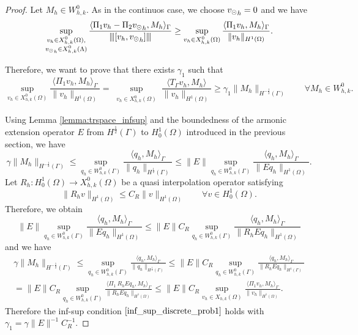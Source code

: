 \begin{proof}
Let $M_h \in W^0_{h,k}$. As in the continuos case, we choose ${v_{\odot}}_h =0$ and we have
\begin{equation*}
\sup_{\substack{v_h \in X^0_{h,k}(\Omega),\\ {v_{\odot}}_h \in X^0_{h,k}(\Lambda)}} \frac{ \langle \Pi_1 v_h - \Pi_2 {v_{\odot}}_h, M_h \rangle _{\Gamma}} {{\left\vert\kern-0.25ex\left\vert\kern-0.25ex\left\vert [v_h,  {v_{\odot}}_h] \right\vert\kern-0.25ex\right\vert\kern-0.25ex\right\vert}}
\geq \sup_{v_h \in X^0_{h,k}(\Omega)} \frac{ \langle \Pi_1 v_h, M_h \rangle _{\Gamma} } {\|v_h\|_{H^1(\Omega)}}.
\end{equation*}

Therefore, we want to prove that there exists $\gamma _1$ such that
\begin{equation*}
\sup_{v_h \in X^0_{h,k}(\Omega)} \frac{ \langle \Pi_1 v_h, M_h \rangle _{\Gamma} } {\|v_h\|_{H^1(\Omega)}}=\sup_{\substack{v_h \in X^0_{h,k}(\Omega)}} \frac{\langle T_{\Gamma} v_h , M_h \rangle}{\|v_h\|_{H^1(\Omega)}} \geq \gamma_1 \|M_h\|_{H^{-\frac 12}(\Gamma)} \qquad \forall M_h \in W_{h,k}^0.
\end{equation*}

Using Lemma \ref{lemma:trspace_infsup} and the boundedness of the armonic extension operator $E$ from $H^{\frac 12}(\Gamma)$ to $H^1_0(\Omega)$ introduced in the previous section, we have
\begin{equation*}
\gamma \|M_h\|_{H^{-\frac 12}(\Gamma)} \leq  \sup_{q_h \in W_{h,k}^0(\Gamma)} \frac{ \langle q_h, M_h \rangle _{\Gamma} } {\|q_h\|_{H^{\frac 12}(\Gamma)}} 
\leq 
\|E\| \sup_{q_h \in W_{h,k}^0(\Gamma)} \frac{ \langle q_h, M_h \rangle _{\Gamma} } {\|Eq_h\|_{H^1(\Omega)}} .
\end{equation*}
Let $R_h: H^1_0(\Omega) \rightarrow X_{h,k}^0(\Omega)$ be a quasi interpolation operator satisfying 
\begin{equation*}
\|R_h v\|_{H^1(\Omega)} \leq C_R \|v\|_{H^1(\Omega)} \qquad \forall v \in H^1_0(\Omega).
\end{equation*}
Therefore, we obtain 
\begin{equation*}
\|E\| \sup_{q_h \in W_{h,k}^0(\Gamma)} \frac{ \langle q_h, M_h \rangle _{\Gamma} } {\|Eq_h\|_{H^1(\Omega)}} 
\leq
\|E\| C_R \sup_{q_h \in W_{h,k}^0(\Gamma)} \frac{ \langle q_h, M_h \rangle _{\Gamma} } {\|R_h E q_h\|_{H^1(\Omega)}}
\end{equation*}
and we have
\begin{multline}
\gamma \|M_h\|_{H^{-\frac 12}(\Gamma)} 
\leq 
\sup_{q_h \in W_{h,k}^0(\Gamma)} \frac{ \langle q_h, M_h \rangle_{\Gamma} } {\|q_h\|_{H^{\frac 12}(\Gamma)}} 
\leq
\|E\| C_R \sup_{q_h \in W_{h,k}^0(\Gamma)} \frac{ \langle q_h, M_h \rangle_{\Gamma} } {\|R_h E q_h\|_{H^1(\Gamma)}}
\\
=
\|E\| C_R \sup_{q_h \in W_{h,k}^0(\Gamma)} \frac{ \langle \Pi_1 \ R_h E q_h, M_h \rangle_{\Gamma} } {\|R_h E q_h\|_{H^1(\Omega)}} 
\leq \|E\| C_R \sup_{v_h \in X_{h,k}(\Omega)} \frac{ \langle \Pi_1 v_h, M_h \rangle_{\Gamma} } {\|v_h\|_{H^1(\Omega)}}. 
\end{multline}
Therefore the inf-sup condition $\eqref{inf_sup_discrete_prob1}$ holds with $\gamma_1 = \gamma\|E\|^{-1} C_R^{-1} $.
\end{proof}

